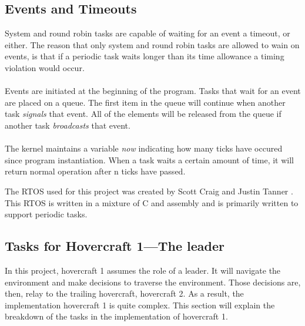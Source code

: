 \subsection{Events and Timeouts}

System and round robin tasks are capable of waiting for an event a timeout, or
either. The reason that only system and round robin tasks are allowed to wain on events, is that if a periodic task waits longer than its time allowance a timing violation would occur. \\

\\
Events are initiated at the beginning of the program. Tasks that wait for an event are placed on a queue. The first item in the queue will continue when another task \textit{signals} that event. All of the elements will be released from the queue if another task \textit{broadcasts} that event. \\

\\
The kernel maintains a variable \textit{now} indicating how many ticks have occured since program instantiation. When a task waits a certain amount of time, it will return normal operation after n ticks have passed.





The RTOS used for this project was created by Scott Craig and Justin Tanner \cite{RTOSSJ}. This RTOS is written in a mixture of C and assembly and is primarily written to support periodic tasks.   






\subsection{Tasks for Hovercraft 1---The leader}
In this project, hovercraft 1 assumes the role of a leader. It will navigate the
environment and make decisions to traverse the environment. Those decisions are,
then, relay to the trailing hovercraft, hovercraft 2. As a result, the
implementation hovercraft 1 is quite complex. This section will explain the
breakdown of the tasks in the implementation of hovercraft 1.

